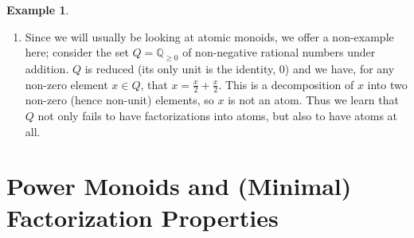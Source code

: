 \documentclass{report}
\newcommand{\F}{\mathcal{F}}
\newcommand{\NN}{\mathbb{N}}
\renewcommand{\:}{\text{:}}
\theoremstyle{definition}
\newtheorem{eg}[defn]{Example}
\begin{document}
\begin{eg}
\begin{enumerate}[label={\rm (\roman{*})}]
\begin{itemize}
\item \textit{Monoids of zero-sum sequences}: for a finite abelian group $G$, this monoid consists of formal words or ``sequences" in the elements of $G$ whose sums are equal to $0$.  
The interest in these monoids can be traced back to the study of the class group of a Dedekind domain (usually a ring of integers of a number field).  \textcolor{red}{[CITE SOME PAPERS]}

\item \textit{Integer-valued polynomials}: let $D$ be a domain with field of fractions $K$; then $\operatorname{Int}(D) := \{f(x) \in K[x]: f(D) \subseteq D \}$ is the ring of integer-valued polynomials of $D$.
In addition to the rich theory developed around understanding the prime ideal structure of this ring, it is amenable to the study of factorization behavior, and exhibits some surprising behaviors.  
For example, any finite subset of $\NN_{\ge2}$ can be realized as the set of factorization lengths of some polynomial $f(x)\in \operatorname{Int}(D)$.
Additionally, one can pose similar questions regarding the ring $\operatorname{Int}^\text{R}(D)$ of integer-valued rational functions. \textcolor{red}{[CITE SOME PAPERS]}
\end{itemize}
\item Since we will usually be looking at atomic monoids, we offer a non-example here; consider the set $Q = \mathbb{Q}_{\ge 0}$ of non-negative rational numbers under addition.
$Q$ is reduced (its only unit is the identity, $0$) and we have, for any non-zero element $x\in Q$, that $x = \frac{x}{2} + \frac{x}{2}$.
This is a decomposition of $x$ into two non-zero (hence non-unit) elements, so $x$ is not an atom.
Thus we learn that $Q$ not only fails to have factorizations into atoms, but also to have atoms at all.
\end{enumerate}
\end{eg}

\chapter{Power Monoids and (Minimal) Factorization Properties} \label{ch:power monoids}
\end{document}
